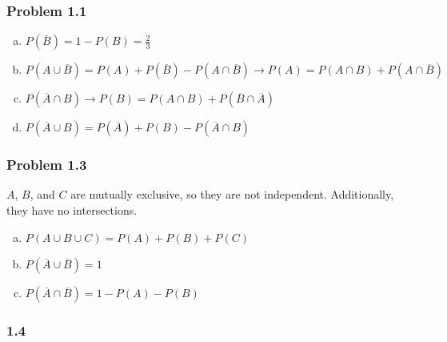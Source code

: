 \documentclass{report}
\begin{document}
\subsubsection*{Problem 1.1}

\begin{enumerate}[(a)]

\item $P(\overline{B}) = 1 - P(B) = \frac{2}{3}$

\item $P(A \cup \overline{B}) = P(A) + P(\overline{B}) - P(A \cap \overline{B}) \rightarrow P(A) = P(A \cap B) + P(A \cap \overline{B})$

\item $P(\overline{A} \cap B) \rightarrow P(B) = P(A \cap B) + P(\overline{B} \cap \overline{A})$

\item $P(\overline{A} \cup B) = P(\overline{A}) + P(B) - P(\overline{A} \cap B)$

\end{enumerate}


\subsubsection*{Problem 1.3}

$A$, $B$, and $C$ are mutually exclusive, so they are not independent. Additionally, they have no intersections.


\begin{enumerate}[(a)]

\item $P(A \cup B \cup C) = P(A) + P(B) + P(C)$

\item $P(\overline{A} \cup \overline{B}) = 1$

\item $P(\overline{A} \cap \overline{B}) = 1 - P(A) - P(B)$ 


\end{enumerate}

\subsubsection*{1.4}
\end{document}
